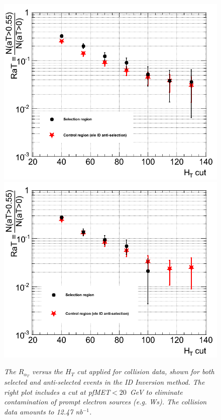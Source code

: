 \begin{figure}[h!]
\centering
\includegraphics[scale=0.32]{Plots/RaT_pt10.png}
\includegraphics[scale=0.32]{Plots/RaT_pt10_anticut.png}
\caption{\textit{The $R_{\alpha_T}$ versus the $H_{T}$ cut applied for collision data, shown for both selected and anti-selected events in the ID Inversion method. The right plot includes a cut at pfMET$<20$~GeV to eliminate contamination of prompt electron sources (e.g. Ws). The collision data amounts to 12.47 nb$^{-1}$.}}
\label{fig:datamcRat}
\end{figure}
